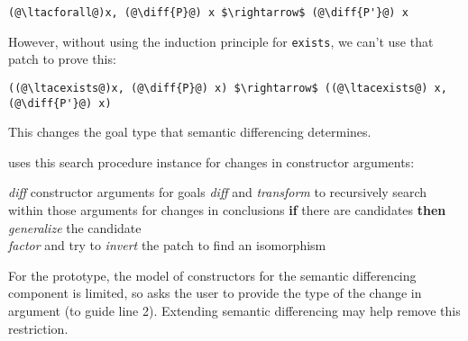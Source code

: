 \begin{lstlisting}[language=coq]
   (@\ltacforall@)x, (@\diff{P}@) x $\rightarrow$ (@\diff{P'}@) x
\end{lstlisting}
However, without using the induction principle for \lstinline{exists}, we can't use that patch to prove this:

\begin{lstlisting}[language=coq]
   ((@\ltacexists@)x, (@\diff{P}@) x) $\rightarrow$ ((@\ltacexists@) x, (@\diff{P'}@) x)
\end{lstlisting}
This changes the goal type that semantic differencing determines.

\sysname uses this search procedure instance for changes in constructor arguments:

\begin{algorithm}
\footnotesize
\begin{algorithmic}[1]
    \STATE \textit{diff} constructor arguments for goals
    \STATE \textit{diff} and \textit{transform} to recursively search within those arguments for changes in conclusions
    \STATE \textbf{if} there are candidates \textbf{then}
    \STATE \hspace*{1em} \textit{generalize} the candidate \\
           \hspace*{1em} \textit{factor} and try to \textit{invert} the patch to find an isomorphism
\end{algorithmic}
\end{algorithm}
For the prototype, the model of constructors for the semantic differencing component is limited,
so \sysname asks the user to provide the type of the change in argument (to guide line 2).
Extending semantic differencing may help remove this restriction.





